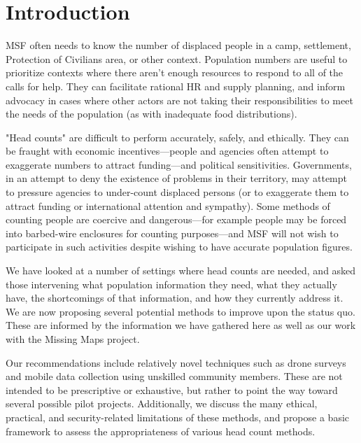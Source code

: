 \documentclass[a4paper,12pt,twoside]{article}
\begin{document}
\section{Introduction}
\begin{multicols}{2}
MSF often needs to know the number of displaced people in a camp, settlement, Protection of Civilians area, or other context. Population numbers are useful to prioritize contexts where there aren't enough resources to respond to all of the calls for help. They can facilitate rational HR and supply planning, and inform advocacy in cases where other actors are not taking their responsibilities to meet the needs of the population (as with inadequate food distributions). 

"Head counts" are difficult to perform accurately, safely, and ethically. They can be fraught with economic incentives---people and agencies often attempt to exaggerate numbers to attract funding---and political sensitivities. Governments, in an attempt to deny the existence of problems in their territory, may attempt to pressure agencies to under-count displaced persons (or to exaggerate them to attract funding or international attention and sympathy). Some methods of counting people are coercive and dangerous---for example people may be forced into barbed-wire enclosures for counting purposes---and MSF will not wish to participate in such activities despite wishing to have accurate population figures. 

We have looked at a number of settings where head counts are needed, and asked
those intervening what population information they need, what they actually have, the shortcomings of that information, and how they currently address it. We are now proposing several potential methods to improve upon the status quo. These are informed by the information we have gathered here as well as our work with the Missing Maps project.

Our recommendations include relatively novel techniques such as drone surveys and mobile data collection using unskilled community members. These are not intended to be prescriptive or exhaustive, but rather to point the way toward several possible pilot projects. Additionally, we discuss the many ethical, practical, and security-related limitations of these methods, and propose a basic framework to assess the appropriateness of various head count methods.

\end{multicols}
\end{document}
